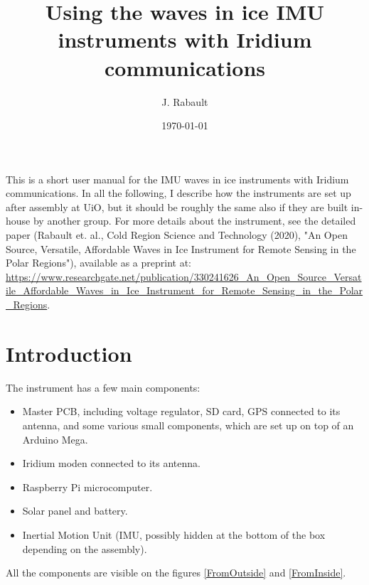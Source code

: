 \documentclass[pdftex,a4paper,12pt,twocolumn,fleqn,captions=tableheading]{scrartcl}
\begin{document}
\title{Using the waves in ice IMU instruments with Iridium communications}
\author{J. Rabault
  }
\date{\today}

\maketitle

This is a short user manual for the IMU waves in ice instruments with Iridium communications. In all the following, I describe how the instruments are set up after assembly at UiO, but it should be roughly the same also if they are built in-house by another group. For more details about the instrument, see the detailed paper (Rabault et. al., Cold Region Science and Technology (2020), "An Open Source, Versatile, Affordable Waves in Ice Instrument for Remote Sensing in the Polar Regions"), available as a preprint at: ~\\

\url{https://www.researchgate.net/publication/330241626_An_Open_Source_Versatile_Affordable_Waves_in_Ice_Instrument_for_Remote_Sensing_in_the_Polar_Regions}.

\section{Introduction}

The instrument has a few main components:

\begin{itemize}
  \item Master PCB, including voltage regulator, SD card, GPS connected to its antenna, and some various small components, which are set up on top of an Arduino Mega.
  \item Iridium moden connected to its antenna.
  \item Raspberry Pi microcomputer.
  \item Solar panel and battery.
  \item Inertial Motion Unit (IMU, possibly hidden at the bottom of the box depending on the assembly).
\end{itemize}

All the components are visible on the figures \ref{FromOutside} and \ref{FromInside}.
\end{document}

